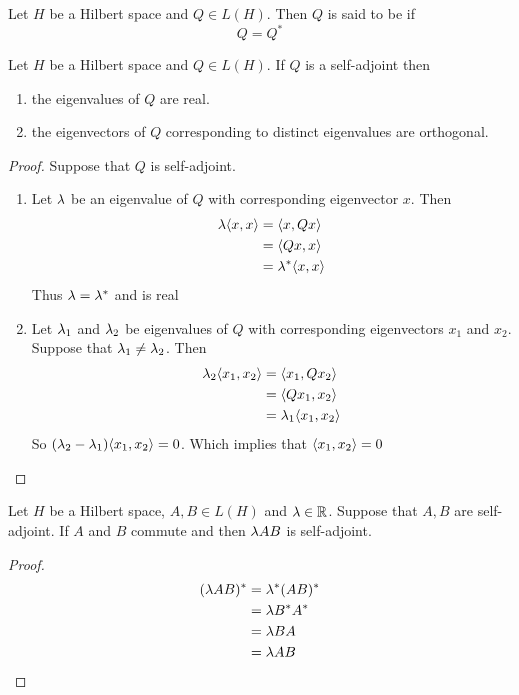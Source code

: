 \documentclass{book}
\begin{document}
\begin{defn} \ld{}
	Let $H$ be a Hilbert space and $Q \in L(H)$. Then $Q$ is said to be  if $$Q = Q^{*}$$
\end{defn}

\begin{ex} \lex{}
	Let $H$ be a Hilbert space and $Q \in L(H)$. If $Q$ is a self-adjoint then 
	\begin{enumerate}
		\item the eigenvalues of $Q$ are real. 
		\item the eigenvectors of $Q$ corresponding to distinct eigenvalues are orthogonal.
	\end{enumerate}
\end{ex}

\begin{proof}
	Suppose that $Q$ is self-adjoint.
	\begin{enumerate}
		\item Let $\lambda$ be an eigenvalue of $Q$ with corresponding eigenvector $x$. Then 
		\begin{align*}
			\lambda \langle x , x\rangle
			&= \langle x , Q x\rangle \\
			&= \langle Q x , x\rangle \\
			&= \lambda^* \langle x , x\rangle
		\end{align*}
		Thus $\lambda = \lambda^*$ and is real
		
		\item Let $\lambda_1$ and $\lambda_2$ be eigenvalues of $Q$ with corresponding eigenvectors $x_1$ and $x_2$. Suppose that $\lambda_1 \neq \lambda_2$. Then 
		\begin{align*}
			\lambda_2 \langle x_1 ,  x_2\rangle
			&= \langle x_1 , Q x_2\rangle\\
			&= \langle Q x_1 ,  x_2\rangle\\
			&= \lambda_1 \langle x_1 ,  x_2\rangle
		\end{align*}
		So $(\lambda_2 - \lambda_1)\langle x_1 ,  x_2\rangle = 0$. Which implies that $\langle x_1 ,  x_2\rangle=0$
	\end{enumerate}
\end{proof}

\begin{ex} \lex{}
	Let $H$ be a Hilbert space, $A, B \in L(H)$ and $ \lambda \in \mathbb{R}$. Suppose that $A, B$ are self-adjoint. If $A$ and $B$ commute and then $\lambda AB$ is self-adjoint.
\end{ex}

\begin{proof}
	\begin{align*}
		(\lambda AB)^{*}
		&= \lambda^* (AB)^{*} \\
		&= \lambda B^{*} A^{*} \\
		&= \lambda B A \\
		&= \lambda AB
	\end{align*}
\end{proof}
\end{document}
